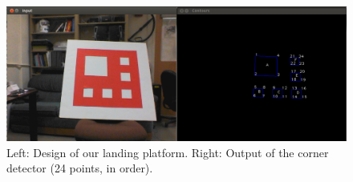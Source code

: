 \documentclass{acm_proc_article-sp}
\begin{document}
\begin{figure}[h]
    \centering
    \includegraphics[width=\textwidth]{images/corners.png}
    \caption{
        Left: Design of our landing platform.
        Right: Output of the corner detector (24 points, in order).
    }
    \label{fig:corners}
\end{figure}
\end{document}
